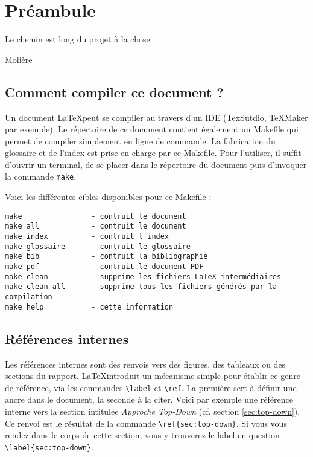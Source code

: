 \chapter{Préambule}
\epigraph{Le chemin est long du projet à la chose.}{Molière}

\section{Comment compiler ce document ?}

Un document \LaTeX peut se compiler au travers d'un IDE (TexSutdio, TeXMaker par exemple).
Le répertoire de ce document contient également un Makefile qui permet de compiler simplement en ligne de commande. 
La fabrication du glossaire et de l'index est prise en charge par ce Makefile.
Pour l'utiliser, il suffit d'ouvrir un terminal, de se placer dans le répertoire du document puis d'invoquer la commande \texttt{make}. 


Voici les différentes cibles disponibles pour ce Makefile :
\begin{verbatim}
make                - contruit le document
make all            - contruit le document
make index          - contruit l'index
make glossaire      - contruit le glossaire
make bib            - contruit la bibliographie
make pdf            - contruit le document PDF
make clean          - supprime les fichiers LaTeX intermédiaires
make clean-all      - supprime tous les fichiers générés par la compilation
make help           - cette information
\end{verbatim}


\section{Références internes}

Les références internes sont des renvois vers des figures, des tableaux ou des sections du rapport.
\LaTeX introduit un mécanisme simple pour établir ce genre de référence, via les commandes \texttt{\textbackslash label} et \texttt{\textbackslash ref}. 
La première sert à définir une ancre dans le document, la seconde à la citer.
Voici par exemple une référence interne vers la section intitulée \textit{Approche Top-Down} (cf. section  \ref{sec:top-down}). Ce renvoi est le résultat de la commande \texttt{\textbackslash ref\{sec:top-down\}}. Si vous vous rendez dans le corps de cette section, vous y trouverez le label en question \texttt{\textbackslash label\{sec:top-down\}}. 

